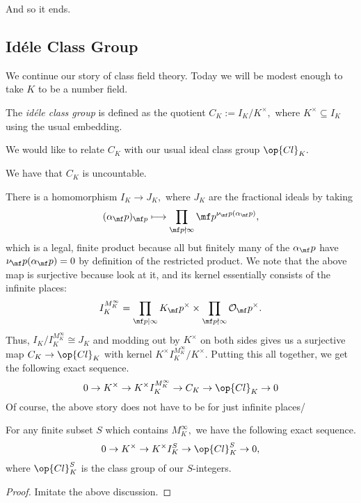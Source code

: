 















And so it ends.

\subsection{Id\'ele Class Group}
We continue our story of class field theory. Today we will be modest enough to take $K$ to be a number field.
\begin{definition}
	The \textit{id\'ele class group} is defined as the quotient $C_K:=I_K/K^\times,$ where $K^\times\subseteq I_K$ using the usual embedding.
\end{definition}
We would like to relate $C_K$ with our usual ideal class group $\op{Cl}_K.$
\begin{remark}
	We have that $C_K$ is uncountable.
\end{remark}
There is a homomorphism $I_K\to J_K,$ where $J_K$ are the fractional ideals by taking
\[(\alpha_\mf p)_{\mf p}\longmapsto\prod_{\mf p\nmid\infty}\mf p^{\nu_\mf p(\alpha_\mf p)},\]
which is a legal, finite product because all but finitely many of the $\alpha_\mf p$ have $\nu_\mf p(\alpha_\mf p)=0$ by definition of the restricted product. We note that the above map is surjective because look at it, and its kernel essentially consists of the infinite places:
\[I_K^{M_K^\infty}=\prod_{\mf p\mid\infty}K_\mf p^\times\times\prod_{\mf p\nmid\infty}\mathcal O_\mf p^\times.\]
Thus, $I_K/I_K^{M_K^\infty}\cong J_K$ and modding out by $K^\times$ on both sides gives us a surjective map $C_K\to\op{Cl}_K$ with kernel $K^\times I_K^{M_K^\infty}/K^\times.$ Putting this all together, we get the following exact sequence.
\[0\to K^\times\to K^\times I_K^{M_K^\infty}\to C_K\to\op{Cl}_K\to0\]
Of course, the above story does not have to be for just infinite places/
\begin{proposition}
	For any finite subset $S$ which contains $M_K^\infty,$ we have the following exact sequence.
	\[0\to K^\times\to K^\times I_K^S\to\op{Cl}_K^S\to0,\]
	where $\op{Cl}_K^S$ is the class group of our $S$-integers.
\end{proposition}
\begin{proof}
	Imitate the above discussion.
\end{proof}
